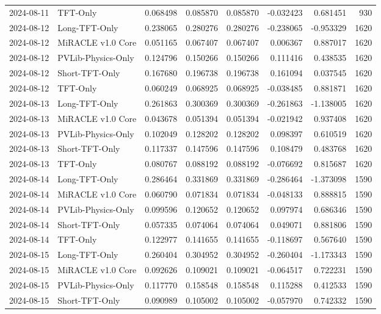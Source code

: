 \begin{tabular}{llrrrrrr}
2024-08-11 & TFT-Only & 0.068498 & 0.085870 & 0.085870 & -0.032423 & 0.681451 & 930 \\
2024-08-12 & Long-TFT-Only & 0.238065 & 0.280276 & 0.280276 & -0.238065 & -0.953329 & 1620 \\
2024-08-12 & MiRACLE v1.0 Core & 0.051165 & 0.067407 & 0.067407 & 0.006367 & 0.887017 & 1620 \\
2024-08-12 & PVLib-Physics-Only & 0.124796 & 0.150266 & 0.150266 & 0.111416 & 0.438535 & 1620 \\
2024-08-12 & Short-TFT-Only & 0.167680 & 0.196738 & 0.196738 & 0.161094 & 0.037545 & 1620 \\
2024-08-12 & TFT-Only & 0.060249 & 0.068925 & 0.068925 & -0.038485 & 0.881871 & 1620 \\
2024-08-13 & Long-TFT-Only & 0.261863 & 0.300369 & 0.300369 & -0.261863 & -1.138005 & 1620 \\
2024-08-13 & MiRACLE v1.0 Core & 0.043678 & 0.051394 & 0.051394 & -0.021942 & 0.937408 & 1620 \\
2024-08-13 & PVLib-Physics-Only & 0.102049 & 0.128202 & 0.128202 & 0.098397 & 0.610519 & 1620 \\
2024-08-13 & Short-TFT-Only & 0.117337 & 0.147596 & 0.147596 & 0.108479 & 0.483768 & 1620 \\
2024-08-13 & TFT-Only & 0.080767 & 0.088192 & 0.088192 & -0.076692 & 0.815687 & 1620 \\
2024-08-14 & Long-TFT-Only & 0.286464 & 0.331869 & 0.331869 & -0.286464 & -1.373098 & 1590 \\
2024-08-14 & MiRACLE v1.0 Core & 0.060790 & 0.071834 & 0.071834 & -0.048133 & 0.888815 & 1590 \\
2024-08-14 & PVLib-Physics-Only & 0.099596 & 0.120652 & 0.120652 & 0.097974 & 0.686346 & 1590 \\
2024-08-14 & Short-TFT-Only & 0.057335 & 0.074064 & 0.074064 & 0.049071 & 0.881806 & 1590 \\
2024-08-14 & TFT-Only & 0.122977 & 0.141655 & 0.141655 & -0.118697 & 0.567640 & 1590 \\
2024-08-15 & Long-TFT-Only & 0.260404 & 0.304952 & 0.304952 & -0.260404 & -1.173343 & 1590 \\
2024-08-15 & MiRACLE v1.0 Core & 0.092626 & 0.109021 & 0.109021 & -0.064517 & 0.722231 & 1590 \\
2024-08-15 & PVLib-Physics-Only & 0.117770 & 0.158548 & 0.158548 & 0.115288 & 0.412533 & 1590 \\
2024-08-15 & Short-TFT-Only & 0.090989 & 0.105002 & 0.105002 & -0.057970 & 0.742332 & 1590 \\

\end{tabular}
